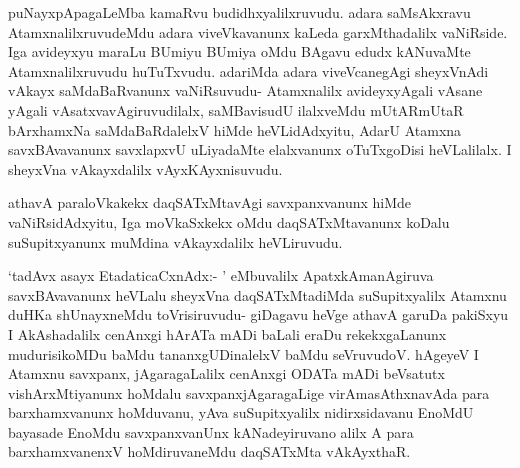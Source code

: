 \begin{artha}
puNayxpApagaLeMba kamaRvu budidhxyalilxruvudu. adara saMsAkxravu AtamxnalilxruvudeMdu adara viveVkavanunx kaLeda garxMthadalilx vaNiRside. Iga avideyxyu maraLu BUmiyu BUmiya oMdu BAgavu edudx kANuvaMte Atamxnalilxruvudu huTuTxvudu. adariMda adara viveVcanegAgi sheyxVnAdi vAkayx saMdaBaRvanunx vaNiRsuvudu- Atamxnalilx avideyxyAgali vAsane yAgali vAsatxvavAgiruvudilalx, saMBavisudU ilalxveMdu mUtARmUtaR bArxhamxNa saMdaBaRdalelxV hiMde heVLidAdxyitu, AdarU Atamxna savxBAvavanunx savxlapxvU uLiyadaMte elalxvanunx oTuTxgoDisi heVLalilalx. I sheyxVna vAkayxdalilx vAyxKAyxnisuvudu. 
\end{artha}

\begin{artha}
athavA paraloVkakekx daqSATxMtavAgi savxpanxvanunx hiMde vaNiRsidAdxyitu,
Iga moVkaSxkekx oMdu daqSATxMtavanunx koDalu suSupitxyanunx muMdina vAkayxdalilx heVLiruvudu.
\end{artha}


\begin{artha}
`tadAvx asayx EtadaticaCxnAdx:- ' eMbuvalilx ApatxkAmanAgiruva savxBAvavanunx heVLalu sheyxVna daqSATxMtadiMda suSupitxyalilx Atamxnu duHKa shUnayxneMdu toVrisiruvudu- giDagavu heVge athavA garuDa pakiSxyu I AkAshadalilx cenAnxgi hArATa mADi baLali eraDu rekekxgaLanunx mudurisikoMDu baMdu tananxgUDinalelxV baMdu seVruvudoV. hAgeyeV I Atamxnu savxpanx, jAgaragaLalilx cenAnxgi ODATa mADi beVsatutx vishArxMtiyanunx hoMdalu savxpanxjAgaragaLige virAmasAthxnavAda para barxhamxvanunx hoMduvanu, yAva suSupitxyalilx nidirxsidavanu EnoMdU bayasade EnoMdu savxpanxvanUnx kANadeyiruvano alilx A para barxhamxvanenxV hoMdiruvaneMdu daqSATxMta vAkAyxthaR. 
\end{artha}%

